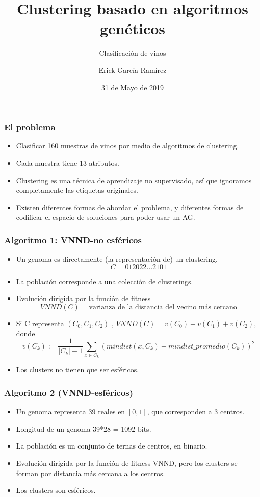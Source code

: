 \documentclass[11pt]{beamer}
\title{Clustering basado en algoritmos genéticos}
\subtitle{Clasificación de vinos}
\author[E. García Ramírez]{Erick García Ramírez}
\institute{Algoritmos Genéticos\\ {\tiny 2019-II MCIC--IIMAS, UNAM}}
\date{31 de Mayo de 2019}
\begin{document}
\begin{frame}
\maketitle
\end{frame}

\begin{frame}
    \frametitle{El problema}
    \begin{itemize}
        \item Clasificar 160 muestras de vinos por medio de algoritmos de clustering. 
        \item Cada muestra tiene 13 atributos.
        \item Clustering es una técnica de aprendizaje no supervisado, así que ignoramos completamente las etiquetas
            originales. 
        \item Existen diferentes formas de abordar el problema, y diferentes formas de codificar el espacio de
                soluciones para poder usar un AG. 
    \end{itemize}
\end{frame}
\begin{frame}[fragile]
    \frametitle{Algoritmo 1: VNND-no esféricos}
        \begin{itemize}
            \item Un genoma es directamente (la representación de) un clustering. 
                \[C = 012022\dots2101\]
            \item La población corresponde a una colección de clusterings.
            \item Evolución dirigida por la función de fitness
                \[VNND(C) = \text{varianza de la distancia del vecino más cercano}\]
            \item Si C representa $(C_0, C_1, C_2)$ , $VNND(C) = v(C_0)+v(C_1)+v(C_2)$, donde
                \[v(C_k):=\frac{1}{|C_k|-1} \sum_{x\in C_k} (mindist(x,C_k)-mindist\_promedio(C_k))^2 \]
            \item Los clusters no tienen que ser esféricos.
        \end{itemize}

\end{frame}

\begin{frame}[fragile]
    \frametitle{Algoritmo 2 (VNND-esféricos)}
        \begin{itemize}
            \item Un genoma representa 39 reales en $[0,1]$, que corresponden a 3 centros. 
            \item Longitud de un genoma 39*28 = 1092 bits. 
            \item La población es un conjunto de ternas de centros, en binario. 
                \item Evolución dirigida por la función de fitness VNND, pero los clusters se forman por distancia
                    más cercana a los centros. 
                \item Los clusters son esféricos.
        \end{itemize}

\end{frame}
\end{document}
